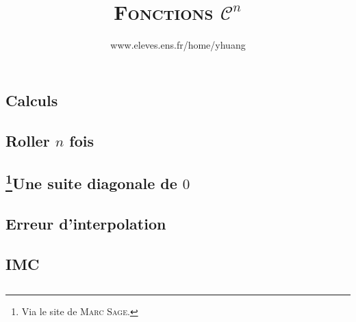 \documentclass{article}
\begin{document}
\setcounter{section}{17}

\title{\textsc{Fonctions $\mathcal{C}^n$}}
\author{www.eleves.ens.fr/home/yhuang}
\date{}
\maketitle

\subsection{Calculs}

\subsection{Roller $n$ fois}

\subsection{\protect\footnote{Via le site de \textsc{Marc Sage}.}Une suite diagonale de $0$}

\subsection{Erreur d'interpolation}

\subsection{IMC}

\subsection{}
\end{document}
